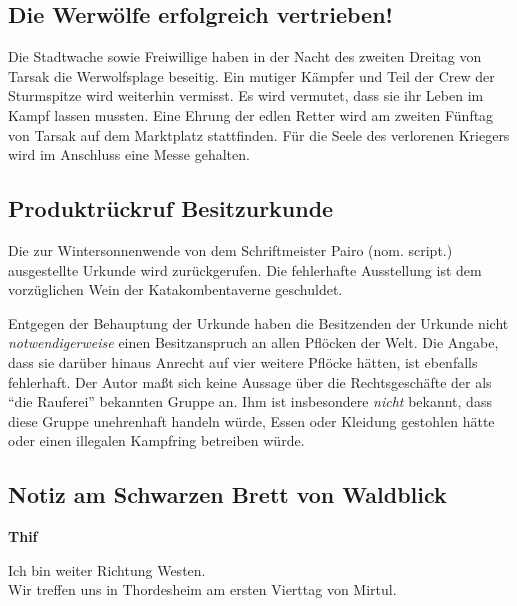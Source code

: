 \documentclass[final]{multiversum}
\begin{document}
\subsection{Die Werwölfe erfolgreich vertrieben!}

Die Stadtwache sowie Freiwillige haben in der Nacht des zweiten Dreitag von Tarsak die Werwolfsplage beseitig. 
Ein mutiger Kämpfer und Teil der Crew der Sturmspitze wird weiterhin vermisst. 
Es wird vermutet, dass sie ihr Leben im Kampf lassen mussten.
Eine Ehrung der edlen Retter wird am zweiten Fünftag von Tarsak auf dem Marktplatz stattfinden. Für die Seele des verlorenen Kriegers wird im Anschluss eine Messe gehalten.


\subsection{Produktrückruf Besitzurkunde}
Die zur Wintersonnenwende von dem Schriftmeister Pairo (nom. script.) ausgestellte Urkunde wird zurückgerufen.
Die fehlerhafte Ausstellung ist dem vorzüglichen Wein der Katakombentaverne geschuldet.

Entgegen der Behauptung der Urkunde haben die Besitzenden der Urkunde nicht \textit{notwendigerweise} einen Besitzanspruch an allen Pflöcken der Welt.
Die Angabe, dass sie darüber hinaus Anrecht auf vier weitere Pflöcke hätten, ist ebenfalls fehlerhaft.
Der Autor maßt sich keine Aussage über die Rechtsgeschäfte der als \enquote{die Rauferei} bekannten Gruppe an.
Ihm ist insbesondere \textit{nicht} bekannt, dass diese Gruppe unehrenhaft handeln würde, Essen oder Kleidung gestohlen hätte oder einen illegalen Kampfring betreiben würde.


\subsection{Notiz am Schwarzen Brett von Waldblick}
\begin{center}
    \textbf{Thif}
\end{center}
\vspace{-1.5em}
\noindent
Ich bin weiter Richtung Westen. \\
Wir treffen uns in Thordesheim am ersten Vierttag von Mirtul.
\end{document}
